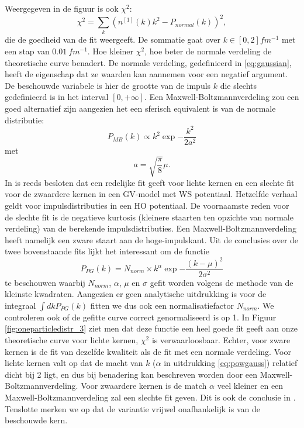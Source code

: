 \documentclass[11pt,twoside]{book}
\begin{document}
Weergegeven in de figuur is ook $\chi^2$:
\begin{equation} \label{eq:chisquared}
\chi^2 = \sum_k (n^{[1]}(k)k^2 - P_{normal}(k))^2,
\end{equation}
die de goedheid van de fit weergeeft. De sommatie gaat over $k \in  [0,2]  fm^{-1}$ met een stap van $0.01\ fm^{-1}$. Hoe kleiner $\chi^2$, hoe beter de normale verdeling de theoretische curve benadert. 
De normale verdeling, gedefinieerd in \eqref{eq:gaussian}, heeft de eigenschap dat ze waarden kan aannemen voor een negatief argument. De beschouwde variabele is hier de grootte van de impuls $k$ die slechts gedefinieerd is in het interval $[ 0, + \infty]$. Een Maxwell-Boltzmannverdeling zou een goed alternatief zijn aangezien het een sferisch equivalent is van de normale distributie:
\begin{equation}
P_{MB}(k) \propto k^2 \exp{-\frac{k^2}{2a^2}}
\end{equation} 
met 
\begin{equation}
a= \sqrt{\frac{\pi}{8}}\mu.
\end{equation}
In \cite{PhysRevC.86.044619} is reeds besloten dat een redelijke fit geeft voor lichte kernen en een slechte fit voor de zwaardere kernen in een GV-model met WS potentiaal. Hetzelfde verhaal geldt voor impulsdistributies in een HO potentiaal. De voornaamste reden voor de slechte fit is de negatieve kurtosis (kleinere staarten ten opzichte van normale verdeling) van de berekende impulsdistributies. Een Maxwell-Boltzmannverdeling heeft namelijk een zware staart aan de hoge-impulskant.
Uit de conclusies over de twee bovenstaande fits lijkt het interessant om de functie
\begin{equation} \label{eq:powgauss}
P_{PG}(k) = N_{norm} \times k^\alpha \exp{-\frac{(k-\mu)^2}{2\sigma^2}}
\end{equation} 
te beschouwen waarbij $N_{norm}$, $\alpha$, $\mu$ en $\sigma$ gefit worden volgens de methode van de kleinste kwadraten. Aangezien er geen analytische uitdrukking is voor de integraal $\int dk P_{PG}(k)$ fitten we dus ook een normalisatiefactor $N_{norm}$. We controleren ook of de gefitte curve correct genormaliseerd is op 1. In Figuur \ref{fig:oneparticledistr_3} ziet men dat deze functie een heel goede fit geeft aan onze theoretische curve voor lichte kernen, $\chi^2$ is verwaarloosbaar. Echter, voor zware kernen is de fit van dezelfde kwaliteit als de fit met een normale verdeling. Voor lichte kernen valt op dat de macht van $k$ ($\alpha$ in uitdrukking \eqref{eq:powgauss}) relatief dicht bij 2 ligt, en dus bij benadering kan beschreven worden door een Maxwell-Boltzmannverdeling. Voor zwaardere kernen is de match $\alpha$ veel kleiner en een Maxwell-Boltzmannverdeling zal een slechte fit geven. Dit is ook de conclusie in \cite{PhysRevC.86.044619}.
Tenslotte merken we op dat de variantie vrijwel onafhankelijk is van de beschouwde kern. 
\end{document}
